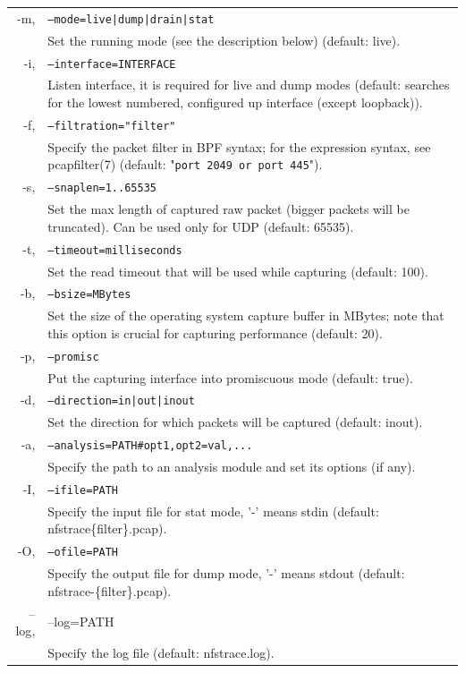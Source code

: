 \documentclass[oneside]{article}
\newcommand{\code}[1]{\texttt{#1}}
\newcommand{\gls}{}
\newcommand*{\textfile}[1]{\textsf{#1}}
\newcommand*{\textprog}[1]{\textfile{#1}}
\begin{document}
\begin{tabularx}{\linewidth}{ r X }
\textprog{-m}, & \code{--mode=live|dump|drain|stat} \\
 & Set the running mode (see the description below) (default: live).\\ 
\textprog{-i}, & \code{--interface=INTERFACE}\\
& Listen interface, it is required for live and dump modes (default: searches
for the lowest numbered, configured up interface (except loopback)).\\
\textprog{-f}, & \code{--filtration="filter"}\\
    & Specify the packet filter in \gls{BPF} syntax; for the expression syntax, see
pcapfilter(7) (default: "\code{port 2049 or port 445}").\\
\textprog{-s}, & \code{--snaplen=1..65535}\\
& Set the max length of captured raw packet (bigger packets will be truncated).
Can be used only for UDP (default: 65535).\\
\textprog{-t}, & \code{--timeout=milliseconds}\\
& Set the read timeout that will be used while capturing (default: 100).\\
\textprog{-b}, & \code{--bsize=MBytes}\\
& Set the size of the operating system capture buffer in MBytes; note that this
option is crucial for capturing performance (default: 20).\\
\textprog{-p}, & \code{--promisc}\\
& Put the capturing interface into promiscuous mode (default: true).\\
\textprog{-d}, & \code{--direction=in|out|inout}\\
& Set the direction for which packets will be captured (default: inout).\\
\textprog{-a}, & \code{--analysis=PATH\#opt1,opt2=val,...}\\
& Specify the path to an analysis module and set its options (if any).\\
\textprog{-I}, & \code{--ifile=PATH}\\
& Specify the input file for stat mode, '-' means stdin (default:
nfstrace\{filter\}.pcap).\\
\textprog{-O}, & \code{--ofile=PATH}\\
& Specify the output file for dump mode, '-' means stdout (default:
nfstrace-\{filter\}.pcap).\\ 
\textprog{--log}, & --log=PATH\\ & Specify the log file (default: nfstrace.log).\\

\end{tabularx}
\end{document}
